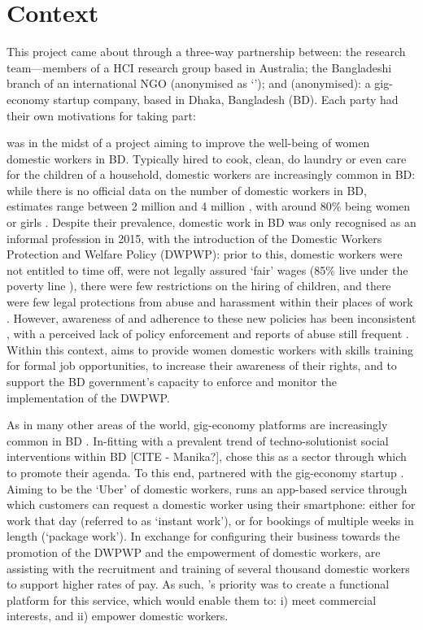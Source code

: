 \section{Context}

This project came about through a three-way partnership between: the research team---members of a HCI research group based in Australia; the Bangladeshi branch of an international NGO (anonymised as `\NGO{}'); and \PC{} (anonymised): a gig-economy startup company, based in Dhaka, Bangladesh (BD). Each party had their own motivations for taking part:

\NGO{} was in the midst of a project aiming to improve the well-being of women domestic workers in BD. Typically hired to cook, clean, do laundry or even care for the children of a household, domestic workers are increasingly common in BD: while there is no official data on the number of domestic workers in BD, estimates range between 2 million \cite{DWRN2011} and 4 million \cite{Ashraf2019}, with around 80\% being women or girls \cite{Ashraf2019}. Despite their prevalence, domestic work in BD was only recognised as an informal profession in 2015, with the introduction of the Domestic Workers Protection and Welfare Policy (DWPWP): prior to this, domestic workers were not entitled to time off, were not legally assured `fair' wages (85\% live under the poverty line \cite{BILS2015}), there were few restrictions on the hiring of children, and there were few legal protections from abuse and harassment within their places of work \cite{IDWF2015}. However, awareness of and adherence to these new policies has been inconsistent \cite{islam2016}, with a perceived lack of policy enforcement and reports of abuse still frequent \cite{DailyStar2018}. Within this context, \NGO{} aims to provide women domestic workers with skills training for formal job opportunities, to increase their awareness of their rights, and to support the BD government's capacity to enforce and monitor the implementation of the DWPWP. 

As in many other areas of the world, gig-economy platforms are increasingly common in BD \cite{Ahmed2020}. In-fitting with a prevalent trend of techno-solutionist social interventions within BD [CITE - Manika?], \NGO{} chose this as a sector through which to promote their agenda. To this end, \NGO{} partnered with the gig-economy startup \PC{}. Aiming to be the `Uber' of domestic workers, \PC{} runs an app-based service through which customers can request a domestic worker using their smartphone: either for work that day (referred to as `instant work'), or for bookings of multiple weeks in length (`package work'). In exchange for configuring their business towards the promotion of the DWPWP and the empowerment of domestic workers, \NGO{} are assisting \PC{} with the recruitment and training of several thousand domestic workers to support higher rates of pay. As such, \PC{}'s priority was to create a functional platform for this service, which would enable them to: i) meet commercial interests, and ii) empower domestic workers.

